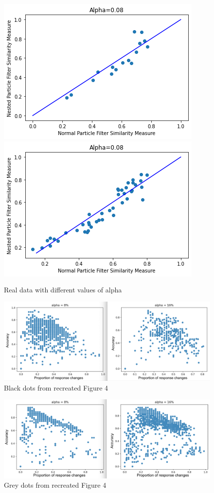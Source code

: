\documentclass[12pt,letterpaper]{article}
\begin{document}
\begin{figure}
    \centering
    \includegraphics[scale = 0.4]{Images/human_plot1.png}
    \includegraphics[scale = 0.4]{Images/human_plot2.png}
    \caption{Real data with different values of alpha} 
\end{figure}

\begin{figure}
    \centering
    \includegraphics[scale = 0.3]{Images/Figure3.png}
    \caption{Black dots from recreated Figure 4} 
\end{figure}

\begin{figure}
    \centering
    \includegraphics[scale = 0.3]{Images/Figure4.png}
    \caption{Grey dots from recreated Figure 4} 
\end{figure}
\end{document}
